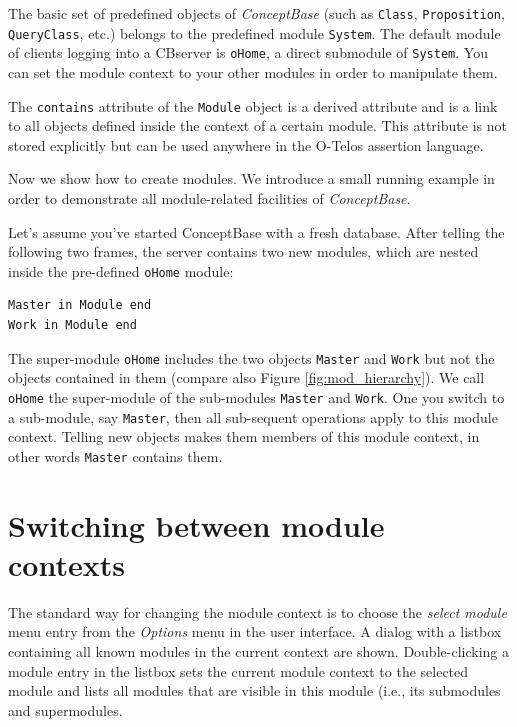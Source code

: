 The basic set of predefined objects of {\em ConceptBase} (such as {\tt Class}, {\tt Proposition}, {\tt QueryClass}, etc.) belongs to the predefined module {\tt System}. 
The default module of clients logging into a CBserver is {\tt oHome}, a direct submodule of {\tt System}.
You can set the module context to your other modules in order to manipulate them.

The {\tt contains} attribute of the {\tt Module} object is a derived attribute and is a link
to all objects defined inside the context of a certain module. This attribute is not stored explicitly
but can be used anywhere in the O-Telos assertion language.

Now we show how to create modules.
We introduce a small running example in order to demonstrate all module-related facilities of
{\em ConceptBase}.

Let's assume you've started ConceptBase with a fresh database.
After telling the following two frames, the server contains two new modules, which are nested inside the pre-defined {\tt oHome} module:


\begin{verbatim}
Master in Module end
Work in Module end
\end{verbatim}

The super-module {\tt oHome} includes the two objects {\tt Master} and {\tt Work} but not the
objects contained in them (compare also Figure \ref{fig:mod_hierarchy}).
We call {\tt oHome} the super-module of the sub-modules
{\tt Master} and {\tt Work}. One you switch to a sub-module, say {\tt Master}, then all
sub-sequent operations apply to this module context. Telling new objects makes
them members of this module context, in other words {\tt Master} contains them.


\section{Switching between module contexts} \label{sec:switching_modules}


The standard way for changing the module context is to choose the {\em select module} menu entry
from the {\em Options} menu in the user interface. A dialog with a listbox containing
all known modules in the current context are shown.
Double-clicking a module entry in the listbox sets the current module context to the
selected module and lists all modules that are visible in this module (i.e., its
submodules and supermodules.

